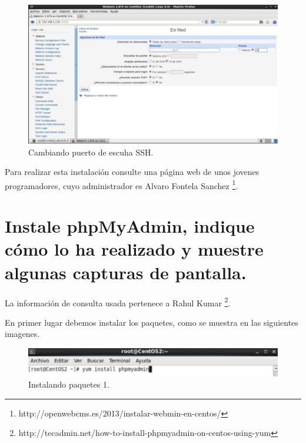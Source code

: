 \begin{figure}[H]
\begin{center}
\includegraphics[scale=0.3]{Imagenes/pregunta15-7.eps}
\caption{Cambiando puerto de escuha SSH.}
\end{center}
\end{figure}


Para realizar esta instalación consulte una página web de unos jovenes programadores, cuyo administrador es Alvaro Fontela Sanchez \footnote{http://openwebcms.es/2013/instalar-webmin-en-centos/}.


\section{Instale phpMyAdmin, indique cómo lo ha realizado y muestre algunas capturas de pantalla.}

La información de consulta usada pertenece a Rahul Kumar \footnote{http://tecadmin.net/how-to-install-phpmyadmin-on-centos-using-yum}.

En primer lugar debemos instalar los paquetes, como se muestra en las siguientes imagenes.
\begin{figure}[H]
\begin{center}
\includegraphics[scale=0.4]{Imagenes/pregunta16-1.eps}
\caption{Instalando paquetes 1.}
\end{center}
\end{figure}

